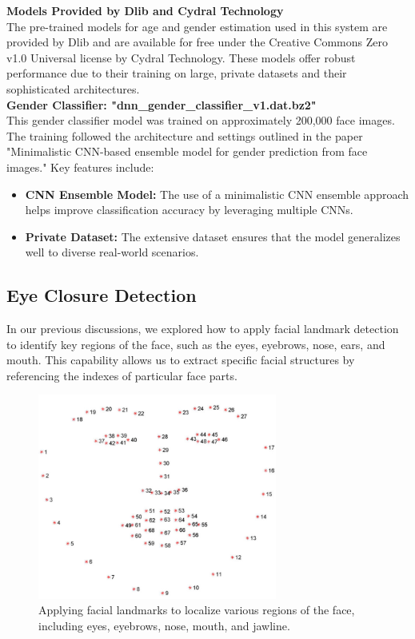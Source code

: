 \textbf{Models Provided by Dlib and Cydral Technology}\\
The pre-trained models for age and gender estimation used in this system are provided by Dlib and are available for free under the Creative Commons Zero v1.0 Universal license by Cydral Technology. These models offer robust performance due to their training on large, private datasets and their sophisticated architectures.\\

\textbf{Gender Classifier: "dnn\_gender\_classifier\_v1.dat.bz2"}\\
This gender classifier model was trained on approximately 200,000 face images. The training followed the architecture and settings outlined in the paper "Minimalistic CNN-based ensemble model for gender prediction from face images." Key features include:
\begin{itemize}
    \item \textbf{CNN Ensemble Model:} The use of a minimalistic CNN ensemble approach helps improve classification accuracy by leveraging multiple CNNs.
\item \textbf{Private Dataset:} The extensive dataset ensures that the model generalizes well to diverse real-world scenarios.
\end{itemize}











\subsection{Eye Closure Detection}

In our previous discussions, we explored how to apply facial landmark detection to identify key regions of the face, such as the eyes, eyebrows, nose, ears, and mouth. This capability allows us to extract specific facial structures by referencing the indexes of particular face parts.

\begin{figure}[H]
    \centering
    \includegraphics[width=0.7\textwidth]{Images/1_AI/68_face_landmarks.png}
    \caption{Applying facial landmarks to localize various regions of the face, including eyes, eyebrows, nose, mouth, and jawline.}
    \label{fig:68_face_landmarks}
\end{figure}

